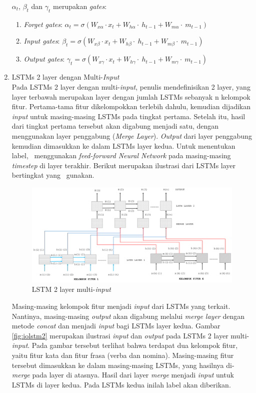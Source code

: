 \begin{enumerate}
	$ \alpha_t $, $ \beta_t $ dan $ \gamma_t $ merupakan \textit{gates}:
	\begin{enumerate}
		\item \textit{Forget gates}: $ \alpha_{t}=\sigma(W_{x\alpha} \cdot x_{t}+W_{h\alpha}\cdot~h_{t-1}+W_{m\alpha}\cdot~m_{t-1}) $
		\item \textit{Input gates}: $ \beta_{t}=\sigma(W_{x\beta}\cdot x_{t}+W_{h\beta}\cdot~h_{t-1}+W_{m\beta}\cdot~m_{t-1}) $
		\item \textit{Output gates}: $ \gamma_{t}=\sigma(W_{x\gamma}\cdot x_{t}+W_{h\gamma}\cdot~h_{t-1}+W_{m\gamma}\cdot~m_{t-1}) $
	\end{enumerate}

	\item LSTMs 2 layer dengan Multi-\textit{Input}\\
	Pada LSTMs 2 layer dengan multi-\textit{input}, penulis mendefinisikan 2 layer, yang layer terbawah merupakan layer dengan jumlah LSTMs sebanyak n kelompok fitur. Pertama-tama fitur dikelompokkan terlebih dahulu, kemudian dijadikan \textit{input} untuk masing-masing LSTMs pada tingkat pertama. Setelah itu, hasil dari tingkat pertama tersebut akan digabung menjadi satu, dengan menggunakan layer penggabung (\textit{Merge Layer}). \textit{Output} dari layer penggabung kemudian dimasukkan ke dalam LSTMs layer kedua. Untuk menentukan label, \saya~menggunakan \textit{feed-forward Neural Network} pada masing-masing \textit{timestep} di layer terakhir. Berikut merupakan ilustrasi dari LSTMs layer bertingkat yang \saya~gunakan.
	
	\begin{figure}
		\centering
		\includegraphics[width=1.0\linewidth]{images/lstm2}
		\caption{LSTM 2 layer multi-\textit{input}}
		\label{fig:lstm2}
	\end{figure}

	Masing-masing kelompok fitur menjadi \textit{input} dari LSTMs yang terkait. Nantinya, masing-masing \textit{output} akan digabung melalui \textit{merge layer} dengan metode \textit{concat} dan menjadi \textit{input} bagi LSTMs layer kedua. Gambar \ref{fig:iolstm2} merupakan ilustrasi \textit{input} dan \textit{output} pada LSTMs 2 layer multi-\textit{input}. Pada gambar tersebut terlihat bahwa terdapat dua kelompok fitur, yaitu fitur kata dan fitur frasa (verba dan nomina). Masing-masing fitur tersebut dimasukkan ke dalam masing-masing LSTMs, yang hasilnya di-\textit{merge} pada layer di atasnya. Hasil dari layer \textit{merge} menjadi \textit{input} untuk LSTMs di layer kedua. Pada LSTMs kedua inilah label akan diberikan.
	

\end{enumerate}
